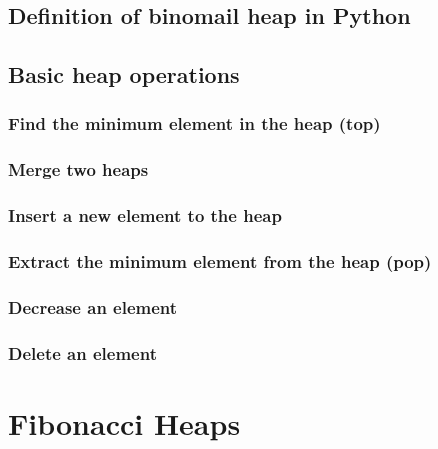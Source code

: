 \documentclass{article}
\begin{document}
\subsection*{Definition of binomail heap in Python}

\subsection{Basic heap operations}

\subsubsection{Find the minimum element in the heap (top)}

\subsubsection{Merge two heaps}

\subsubsection{Insert a new element to the heap}

\subsubsection{Extract the minimum element from the heap (pop)}

\subsubsection{Decrease an element}

\subsubsection{Delete an element}

\section{Fibonacci Heaps}
\label{fib-heap}

\end{document}
